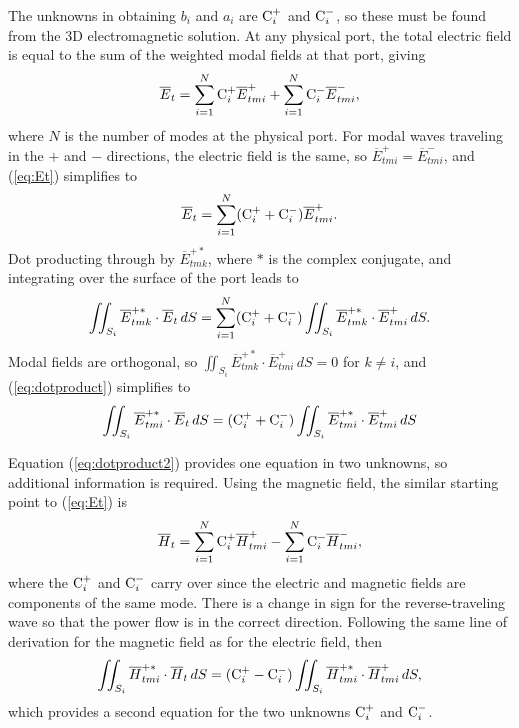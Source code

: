 \documentclass[titlepage]{article}
\renewcommand\_{\textunderscore\linebreak[1]}
\begin{document}
The unknowns in obtaining $b_i$ and $a_i$ are $\textnormal{C}_{i}^{+}$ and $\textnormal{C}_{i}^{-}$, so these must be found from the 3D electromagnetic solution.  At any physical port, the total electric field is equal to the sum of the weighted modal fields at that port, giving
\begin{equation}
\label{eq:Et}
\overline{E}_t=\sum_{i=1}^{N}\textnormal{C}_{i}^{+}\overline{E}_{tmi}^{+}+\sum_{i=1}^{N}\textnormal{C}_{i}^{-}\overline{E}_{tmi}^{-},
\end{equation}
where $N$ is the number of modes at the physical port.
For modal waves traveling in the $+$ and $-$ directions, the electric field is the same, so $\overline{E}_{tmi}^{+}=\overline{E}_{tmi}^{-}$, and (\ref{eq:Et}) simplifies to
\begin{equation}
\overline{E}_t=\sum_{i=1}^{N}(\textnormal{C}_{i}^{+}+\textnormal{C}_{i}^{-})\overline{E}_{tmi}^{+}.
\end{equation}
Dot producting through by $\overline{E}_{tmk}^{+*}$, where $*$ is the complex conjugate, and integrating over the surface of the port leads to
\begin{equation}
\label{eq:dotproduct}
\iint_{S_i}\overline{E}_{tmk}^{+*}\cdot\overline{E}_t\,dS=\sum_{i=1}^{N}(\textnormal{C}_{i}^{+}+\textnormal{C}_{i}^{-})\iint_{S_i}\overline{E}_{tmk}^{+*}\cdot\overline{E}_{tmi}^{+}\,dS.
\end{equation}
Modal fields are orthogonal, so $\iint_{S_i}\overline{E}_{tmk}^{+*}\cdot\overline{E}_{tmi}^{+}\,dS=0$ for $k\neq i$, and (\ref{eq:dotproduct}) simplifies to
\begin{equation}
\label{eq:dotproduct2}
\iint_{S_i}\overline{E}_{tmi}^{+*}\cdot\overline{E}_t\,dS=(\textnormal{C}_{i}^{+}+\textnormal{C}_{i}^{-})\iint_{S_i}\overline{E}_{tmi}^{+*}\cdot\overline{E}_{tmi}^{+}\,dS
\end{equation}

Equation (\ref{eq:dotproduct2}) provides one equation in two unknowns, so additional information is required.  Using the magnetic field, the similar starting point to (\ref{eq:Et}) is
\begin{equation}
\label{eq:Ht}
\overline{H}_t=\sum_{i=1}^{N}\textnormal{C}_{i}^{+}\overline{H}_{tmi}^{+}-\sum_{i=1}^{N}\textnormal{C}_{i}^{-}\overline{H}_{tmi}^{-},
\end{equation}
where the $\textnormal{C}_{i}^{+}$ and $\textnormal{C}_{i}^{-}$ carry over since the electric and magnetic fields are components of the same mode.  There is a change in sign for the reverse-traveling wave so that the power flow is in the correct direction.  Following the same line of derivation for the magnetic field as for the electric field, then
\begin{equation}
\label{eq:dotproductH}
\iint_{S_i}\overline{H}_{tmi}^{+*}\cdot\overline{H}_t\,dS=(\textnormal{C}_{i}^{+}-\textnormal{C}_{i}^{-})\iint_{S_i}\overline{H}_{tmi}^{+*}\cdot\overline{H}_{tmi}^{+}\,dS,
\end{equation}
which provides a second equation for the two unknowns $\textnormal{C}_{i}^{+}$ and $\textnormal{C}_{i}^{-}$.
\end{document}
